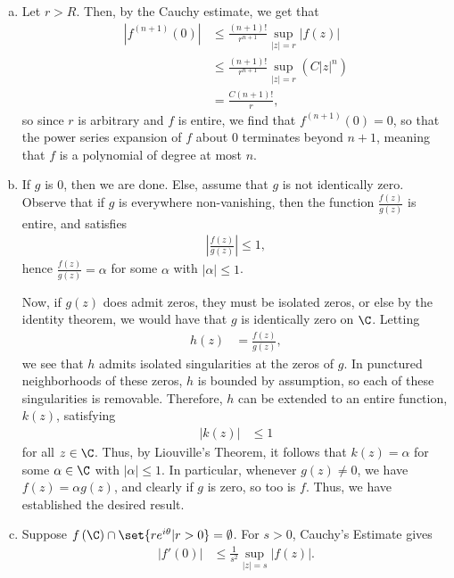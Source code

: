 \documentclass[10pt]{mypackage}
\begin{document}
\begin{solution}\hfill
  \begin{enumerate}[(a)]
    \item Let $r > R$. Then, by the Cauchy estimate, we get that
      \begin{align*}
        \left\vert f^{\left(n+1\right)}(0) \right\vert &\leq \frac{\left( n+1 \right)!}{r^{n+1}}\sup_{|z| = r} \left\vert f(z) \right\vert\\
                                                       &\leq \frac{\left( n+1 \right)!}{r^{n+1}} \sup_{|z| = r} \left( C \left\vert z \right\vert^{n} \right)\\
                                                       &= \frac{C\left( n+1 \right)!}{r},
      \end{align*}
      so since $r$ is arbitrary and $f$ is entire, we find that $ f^{(n+1)}(0) = 0 $, so that the power series expansion of $f$ about $0$ terminates beyond $n + 1$, meaning that $f$ is a polynomial of degree at most $n$.
    \item If $g$ is $0$, then we are done. Else, assume that $g$ is not identically zero. Observe that if $g$ is everywhere non-vanishing, then the function $ \frac{f(z)}{g(z)} $ is entire, and satisfies
      \begin{align*}
        \left\vert \frac{f(z)}{g(z)} \right\vert \leq 1,
      \end{align*}
      hence $ \frac{f(z)}{g(z)} = \alpha $ for some $\alpha$ with $\left\vert \alpha \right\vert \leq 1$.\newline

      Now, if $g(z)$ does admit zeros, they must be isolated zeros, or else by the identity theorem, we would have that $g$ is identically zero on $\C$. Letting
      \begin{align*}
        h(z) &= \frac{f(z)}{g(z)},
      \end{align*}
      we see that $h$ admits isolated singularities at the zeros of $g$. In punctured neighborhoods of these zeros, $h$ is bounded by assumption, so each of these singularities is removable. Therefore, $h$ can be extended to an entire function, $k(z)$, satisfying
      \begin{align*}
        \left\vert k(z) \right\vert &\leq 1
      \end{align*}
      for all $z\in \C$. Thus, by Liouville's Theorem, it follows that $k(z) = \alpha$ for some $\alpha\in \C$ with $\left\vert \alpha \right\vert \leq 1$. In particular, whenever $g(z) \neq 0$, we have $f(z) = \alpha g(z)$, and clearly if $g$ is zero, so too is $f$. Thus, we have established the desired result.
    \item Suppose $f\left( \C \right)\cap \set{re^{i\theta} | r > 0} = \emptyset$. For $s > 0$, Cauchy's Estimate gives
      \begin{align*}
        \left\vert f'(0) \right\vert &\leq \frac{1}{s^2} \sup_{|z| = s} \left\vert f(z) \right\vert.
      \end{align*}
  \end{enumerate}
\end{solution}
\end{document}
